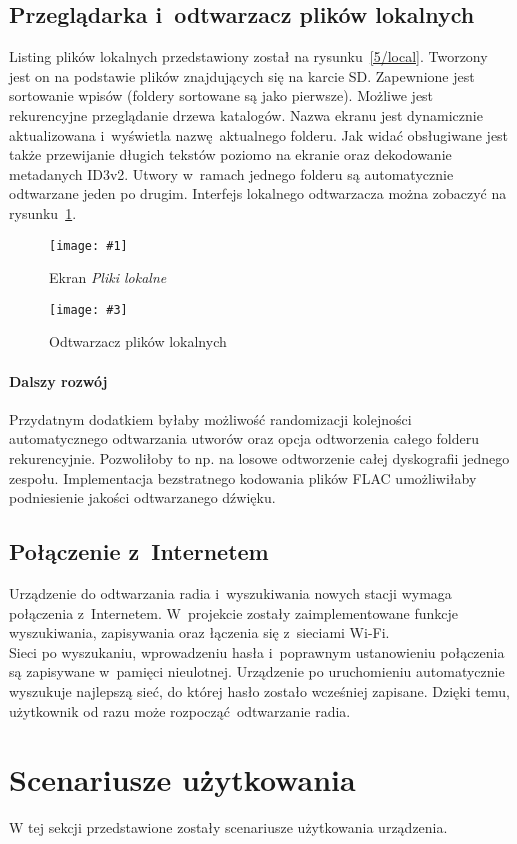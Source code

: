 \documentclass[polish]{aghengthesis}
\newcommand{\imgintss}[5]{
	\begin{figure}[{#5}]
		\centering
		\begin{minipage}{.45\textwidth}
			\centering
			\texttt{[image: \#1]}
			\caption{#2}
			\label{#1}
		\end{minipage}%
		\hfill
		\begin{minipage}{.45\textwidth}
			\centering
			\texttt{[image: \#3]}
			\caption{#4}
			\label{#3}
		\end{minipage}
	\end{figure}
}
\newcommand{\imghss}[4]{\imgintss{#1}{#2}{#3}{#4}{H}}
\begin{document}
		\subsection{Przeglądarka i~odtwarzacz plików lokalnych}
			Listing plików lokalnych przedstawiony został na rysunku~\ref{5/local}. Tworzony jest on na podstawie plików znajdujących się na karcie SD. Zapewnione jest sortowanie wpisów (foldery sortowane są jako pierwsze). Możliwe jest rekurencyjne przeglądanie drzewa katalogów. Nazwa ekranu jest dynamicznie aktualizowana i~wyświetla nazwę aktualnego folderu. Jak widać obsługiwane jest także przewijanie długich tekstów poziomo na ekranie oraz dekodowanie metadanych ID3v2. Utwory w~ramach jednego folderu są automatycznie odtwarzane jeden po drugim. Interfejs lokalnego odtwarzacza można zobaczyć na rysunku~\ref{5/local_play}.
			
			\imghss{5/local}{Ekran \textit{Pliki lokalne}}{5/local_play}{Odtwarzacz plików lokalnych}
			
			\paragraph{Dalszy rozwój}
				Przydatnym dodatkiem byłaby możliwość randomizacji kolejności automatycznego odtwarzania utworów oraz opcja odtworzenia całego folderu rekurencyjnie. Pozwoliłoby to np. na losowe odtworzenie całej dyskografii jednego zespołu. Implementacja bezstratnego kodowania plików FLAC umożliwiłaby podniesienie jakości odtwarzanego dźwięku.
		
		\subsection{Połączenie z~Internetem}
			Urządzenie do odtwarzania radia i~wyszukiwania nowych stacji wymaga połączenia z~Internetem. W~projekcie zostały zaimplementowane funkcje wyszukiwania, zapisywania oraz łączenia się z~sieciami Wi-Fi.
			$ $\\
			
			Sieci po wyszukaniu, wprowadzeniu hasła i~poprawnym ustanowieniu połączenia są zapisywane w~pamięci nieulotnej. Urządzenie po uruchomieniu automatycznie wyszukuje najlepszą sieć, do której hasło zostało wcześniej zapisane. Dzięki temu, użytkownik od razu może rozpocząć odtwarzanie radia.
	
	\section{Scenariusze użytkowania}
		W tej sekcji przedstawione zostały scenariusze użytkowania urządzenia.
	
\end{document}
